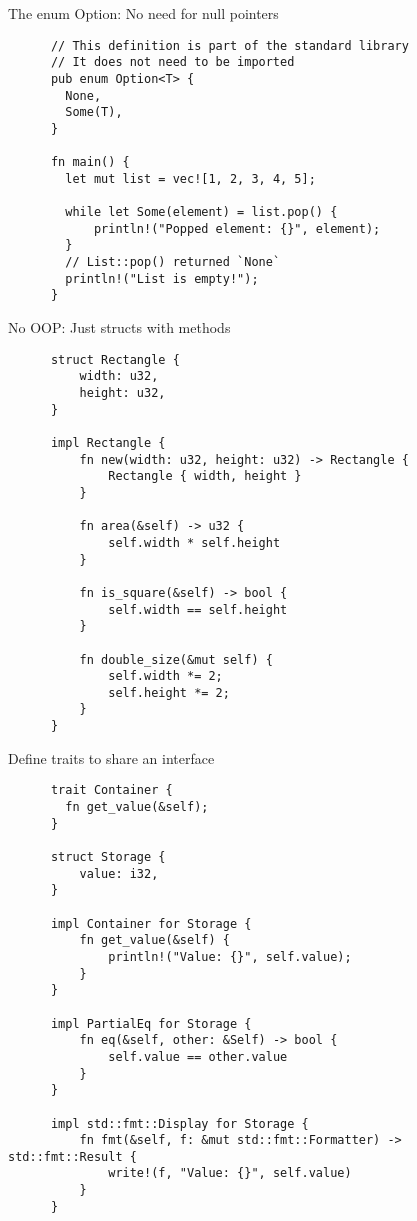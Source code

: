\documentclass{beamer}
\begin{document}
\begin{frame}[fragile]{The enum Option: No need for null pointers}
  \begin{listing}
    \begin{verbatim}
      // This definition is part of the standard library
      // It does not need to be imported
      pub enum Option<T> {
        None,
        Some(T),
      }

      fn main() {
        let mut list = vec![1, 2, 3, 4, 5];
    
        while let Some(element) = list.pop() {
            println!("Popped element: {}", element);
        }
        // List::pop() returned `None`
        println!("List is empty!");
      }
    \end{verbatim}
  \end{listing}
\end{frame}

\begin{frame}[fragile]{No OOP: Just structs with methods}
  \begin{listing}
    \begin{verbatim}
      struct Rectangle {
          width: u32,
          height: u32,
      }
      
      impl Rectangle {
          fn new(width: u32, height: u32) -> Rectangle {
              Rectangle { width, height }
          }
      
          fn area(&self) -> u32 {
              self.width * self.height
          }
      
          fn is_square(&self) -> bool {
              self.width == self.height
          }
      
          fn double_size(&mut self) {
              self.width *= 2;
              self.height *= 2;
          }
      }
    \end{verbatim}
  \end{listing}
\end{frame}

\begin{frame}[fragile]{Define traits to share an interface}
  \begin{listing}
    \begin{verbatim}
      trait Container {
        fn get_value(&self);
      }
      
      struct Storage {
          value: i32,
      }
      
      impl Container for Storage {
          fn get_value(&self) {
              println!("Value: {}", self.value);
          }
      }
      
      impl PartialEq for Storage {
          fn eq(&self, other: &Self) -> bool {
              self.value == other.value
          }
      }
      
      impl std::fmt::Display for Storage {
          fn fmt(&self, f: &mut std::fmt::Formatter) -> std::fmt::Result {
              write!(f, "Value: {}", self.value)
          }
      }
    \end{verbatim}
  \end{listing}
\end{frame}
\end{document}
